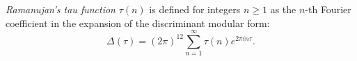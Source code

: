 \textit{Ramanujan's tau function} $\tau(n)$ is defined for integers $n \geq 1$ as the $n$-th Fourier coefficient in the expansion of the discriminant modular form:
$$\Delta(\tau) = (2\pi)^{12} \sum_{n=1}^{\infty} \tau(n) e^{2\pi i n \tau}.$$
